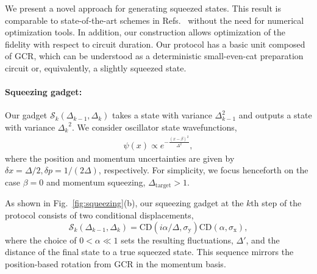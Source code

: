 \documentclass[aps,prx,showpacs,notitlepage,twocolumn,superscriptaddress,nofootinbib,preprintnumbers,floatfix,10pt, longbibliography]{revtex4-2}
\begin{document}
We present a novel approach for generating squeezed states. This result is comparable to state-of-the-art schemes in Refs.~\cite{hastrup2021unconditional,eickbusch2022fast} without the need for numerical optimization tools. In addition, our construction allows optimization of the fidelity with respect to circuit duration. Our protocol has a basic unit composed of $\mathrm{GCR}$, which can be understood as a deterministic small-even-cat preparation circuit or, equivalently, a slightly squeezed state. 

\paragraph{Squeezing gadget:}  Our gadget $\mathcal{S}_k(\Delta_{k-1},\Delta_k)$ takes a state with variance $\Delta_{k-1}^2$ and outputs a state with variance ${\Delta_k}^2$. We consider oscillator state wavefunctions,
\begin{align}
\psi(x)\propto e^{-\frac{(x-\beta)^2}{\Delta^2}},
\end{align}
where the position and momentum uncertainties are given by $\delta x=\Delta/2,\delta p=1/(2\Delta)$, respectively. For simplicity, we focus henceforth on the case $\beta= 0$ and momentum squeezing, $\Delta_{\mathrm{target}} > 1$.

As shown in Fig.~\ref{fig:squeezing}(b), our squeezing gadget at the $k$th step of the protocol consists of two conditional displacements,
\begin{equation}
    \mathcal S_k(\Delta_{k-1},\Delta_{k}) = \mathrm{CD}(i\alpha/\Delta,\sigma_\mathrm{y})\mathrm{CD}(\alpha,\sigma_\mathrm{x}),
\end{equation}
where the choice of $0 < \alpha \ll 1$ sets the resulting fluctuations, $\Delta'$, and the distance of the final state to a true squeezed state. This sequence mirrors the position-based rotation from $\mathrm{GCR}$ in the momentum basis. 
\end{document}
